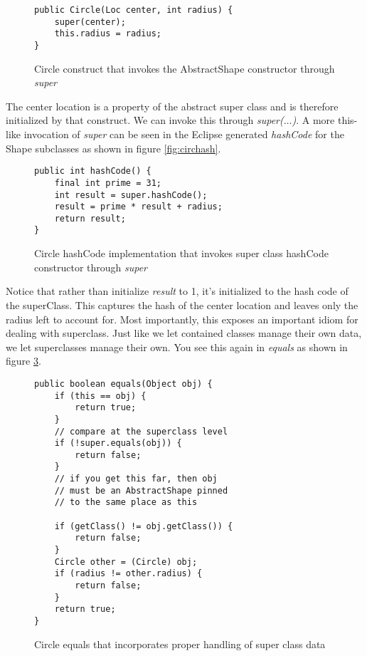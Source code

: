 \documentclass[]{tufte-handout}
\begin{document}
\begin{figure}[!ht]
\begin{lstlisting}
public Circle(Loc center, int radius) {
	super(center);		
	this.radius = radius;
}
\end{lstlisting}
\label{fig:circlector}
\caption{Circle construct that invokes the AbstractShape constructor through \textit{super}}
\end{figure}

The center location is a property of the abstract super class and is therefore initialized by that construct. We can invoke this through \textit{super($\ldots$)}. A more this-like invocation of \textit{super} can be seen in the Eclipse generated \textit{hashCode} for the Shape subclasses as shown in figure \ref{fig:circhash}.


\begin{figure}[!ht]
\begin{lstlisting}
public int hashCode() {
	final int prime = 31;
	int result = super.hashCode();
	result = prime * result + radius;
	return result;
}
\end{lstlisting}
\label{fig:circlector}
\caption{Circle hashCode implementation that invokes super class hashCode constructor through \textit{super}}
\end{figure}

Notice that rather than initialize \textit{result} to 1, it's initialized to the hash code of the superClass. This captures the hash of the center location and leaves only the radius left to account for. Most importantly, this exposes an important idiom for dealing with superclass. Just like we let contained classes manage their own data, we let superclasses manage their own. You see this again in \textit{equals} as shown in figure \ref{fig:circeq}.

\begin{figure}[!ht]
\begin{lstlisting}
public boolean equals(Object obj) {
	if (this == obj) {
		return true;
	}
	// compare at the superclass level
	if (!super.equals(obj)) {
		return false;
	}
	// if you get this far, then obj
	// must be an AbstractShape pinned
	// to the same place as this
	
	if (getClass() != obj.getClass()) {
		return false;
	}
	Circle other = (Circle) obj;
	if (radius != other.radius) {
		return false;
	}
	return true;
}
\end{lstlisting}
\label{fig:circeq}
\caption{Circle equals that incorporates proper handling of super class data}
\end{figure}
\end{document}
